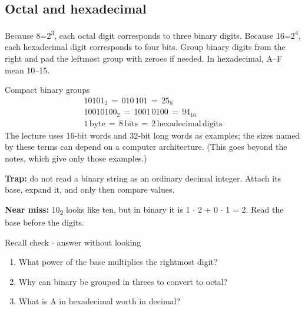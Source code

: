 \documentclass[11pt]{article}
\begin{document}
\begin{keepsection}
\begin{keepsection}
\subsection{Octal and hexadecimal}

Because 8=2\textsuperscript{3}, each octal digit corresponds to three binary digits. Because 16=2\textsuperscript{4}, each hexadecimal digit corresponds to four bits. Group binary digits from the right and pad the leftmost group with zeroes if needed. In hexadecimal, A–F mean 10–15.

\begin{equationcard}{Compact binary groups}
\[ \begin{gathered} 10101_{2}\, =\, 010\, 101\, =\, 25_{8} \\ 10010100_{2}\, =\, 1001\, 0100\, =\, 94_{16} \\ 1\, \text{byte}\, =\, 8\, \text{bits}\, =\, 2\, \text{hexadecimal}\, \text{digits} \end{gathered} \]
{\small The lecture uses 16-bit words and 32-bit long words as examples; the sizes named by these terms can depend on a computer architecture. (This goes beyond the notes, which give only those examples.)}
\end{equationcard}

\begin{notebox}\textbf{Trap:} do not read a binary string as an ordinary decimal integer. Attach its base, expand it, and only then compare values.\end{notebox}

\begin{notebox}\textbf{Near miss:} 10\textsubscript{2} looks like ten, but in binary it is 1 \ensuremath{\cdot} 2 + 0 \ensuremath{\cdot} 1 = 2. Read the base before the digits.\end{notebox}

\begin{recallbox}{Recall check \ensuremath{\cdot} answer without looking}
\begin{enumerate}
\item What power of the base multiplies the rightmost digit?
\item Why can binary be grouped in threes to convert to octal?
\item What is A in hexadecimal worth in decimal?
\end{enumerate}

\end{recallbox}
\end{keepsection}
\end{keepsection}
\end{document}
